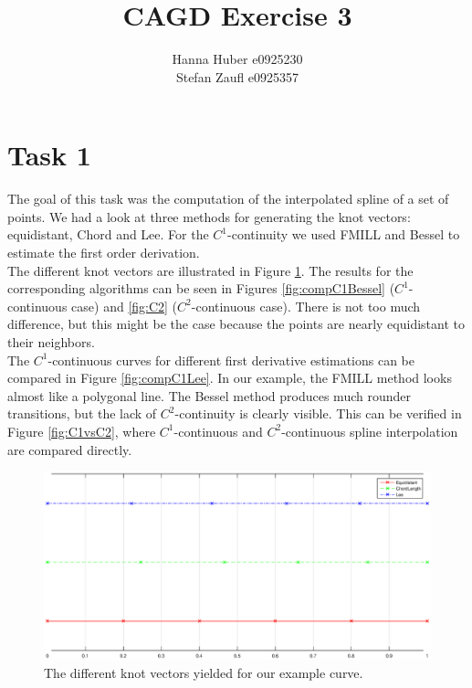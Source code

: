\documentclass[12pt,a4paper]{article}
\title{CAGD Exercise 3}
\author{Hanna Huber e0925230\\Stefan Zaufl e0925357}
\begin{document}
\maketitle
\section{Task 1}
The goal of this task was the computation of the interpolated spline of a set of points. We had a look at three methods for generating the knot vectors: equidistant, Chord and Lee. For the $C^1$-continuity we used FMILL and Bessel to estimate the first order derivation. \\
The different knot vectors are illustrated in Figure \ref{fig:knotvec}. The results for the corresponding algorithms can be seen in Figures \ref{fig:compC1Bessel} ($C^1$-continuous case) and \ref{fig:C2} ($C^2$-continuous case). There is not too much difference, but this might be the case because the points are nearly equidistant to their neighbors. \\
The $C^1$-continuous curves for different first derivative estimations can be compared in Figure \ref{fig:compC1Lee}. In our example, the FMILL method looks almost like a polygonal line. The Bessel method produces much rounder transitions, but the lack of $C^2$-continuity is clearly visible. This can be verified in Figure \ref{fig:C1vsC2}, where $C^1$-continuous and $C^2$-continuous spline interpolation are compared directly. 


\begin{figure}[hbtp]
\centering
\includegraphics[width=\textwidth]{knotvectors.eps}
\caption{The different knot vectors yielded for our example curve.}
\label{fig:knotvec}
\end{figure}
\end{document}
